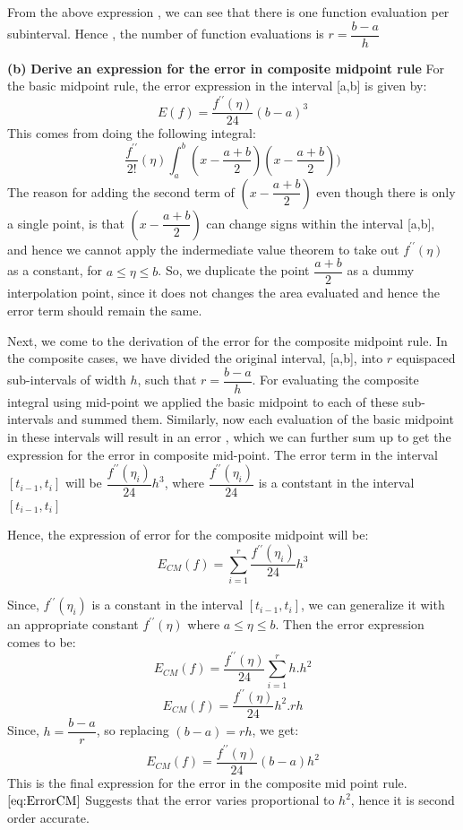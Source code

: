\documentclass{article}
\renewcommand\part[1]{\vspace{.10in}\textbf{(#1)}}
\begin{document}
  From the above expression , we can see that there is one function evaluation per subinterval. Hence , the number of function evaluations is $r = \dfrac{b-a}{h}$ \newline

  \part{b} \textbf {Derive an expression for the error in composite midpoint rule} \newline
  For the basic midpoint rule, the error expression in the interval [a,b] is given by:
  \[E(f) = \dfrac{f^{\prime\prime}(\eta)}{24}(b-a)^3\]
  This comes from doing the following integral:
  \[\dfrac{f^{\prime\prime}}{2!}(\eta)\int_{a}^{b}(x - \dfrac{a+b}{2})(x - \dfrac{a+b}{2})) \]
  The reason for adding the second term of $(x - \dfrac{a+b}{2})$ even though there is only a single point, is that $(x - \dfrac{a+b}{2})$ can change signs within the interval [a,b], and hence we cannot apply the indermediate value theorem to take out $f^{\prime\prime}(\eta)$ as a constant, for $a \leq \eta \leq b$. So, we duplicate the point $\dfrac{a+b}{2}$ as a dummy interpolation point, since it does not changes the area evaluated and hence the error term should remain the same. \newline

  Next, we come to the derivation of the error for the composite midpoint rule. In the composite cases, we have divided the original interval, [a,b], into $r$ equispaced sub-intervals of width $h$, such that $r = \dfrac{b-a}{h}$. For evaluating the composite integral using mid-point we applied the basic midpoint to each of these sub-intervals and summed them. Similarly, now each evaluation of the basic midpoint in these intervals will result in an error , which we can further sum up to get the expression for the error in composite mid-point. The error term in the interval $[t_{i-1},t_i]$ will be $\dfrac{f^{\prime\prime}(\eta_i)}{24}h^3$, where $\dfrac{f^{\prime\prime}(\eta_i)}{24}$ is a contstant in the interval $[t_{i-1},t_i]$
  

  Hence, the expression of error for the composite midpoint will be:
  \[E_{CM}(f) = \sum_{i=1}^r \dfrac{f^{\prime\prime}(\eta_i)}{24}h^3\]

  Since, $f^{\prime\prime}(\eta_i)$ is a constant in the interval $[t_{i-1},t_i]$, we can generalize it with an appropriate constant $f^{\prime\prime}(\eta)$ where $a \leq \eta \leq b$. Then the error expression comes to be:
  \[ E_{CM}(f) = \dfrac{f^{\prime\prime}(\eta)}{24} \sum_{i=1}^{r} h.h^2\]
  \[ E_{CM}(f) = \dfrac{f^{\prime\prime}(\eta)}{24} h^2.rh\]
  Since, $h = \dfrac{b-a}{r}$, so replacing $(b-a) = rh$, we get:
  \begin{equation}
   E_{CM}(f) = \dfrac{f^{\prime\prime}(\eta)}{24}(b-a)h^2
   \label{eq:ErrorCM}
  \end{equation}
  This is the final expression for the error in the composite mid point rule. \newline
  $\eqref{eq:ErrorCM}$ Suggests that the error varies proportional to $h^2$, hence it is second order accurate. 
\end{document}

